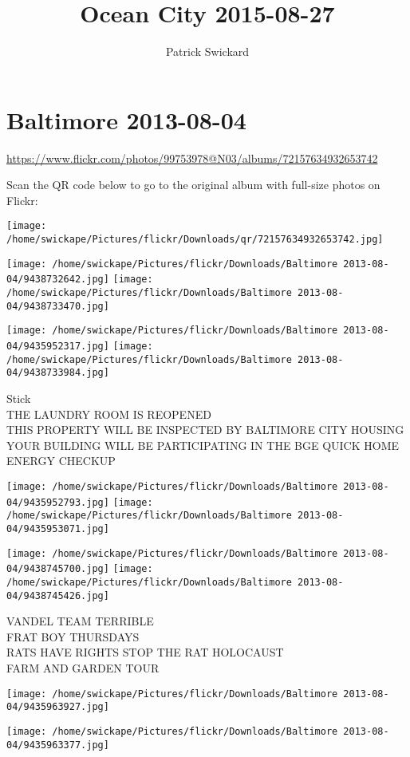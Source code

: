 \documentclass[10pt,letterpaper]{article}
\title{Ocean City 2015-08-27}
\author{Patrick Swickard}
\date{}
\begin{document}
\section*{Baltimore 2013-08-04}

\url{https://www.flickr.com/photos/99753978@N03/albums/72157634932653742}

Scan the QR code below to go to the original album with full-size photos on Flickr:

\texttt{[image: /home/swickape/Pictures/flickr/Downloads/qr/72157634932653742.jpg]}
\pagebreak

\texttt{[image: /home/swickape/Pictures/flickr/Downloads/Baltimore 2013-08-04/9438732642.jpg]}
\texttt{[image: /home/swickape/Pictures/flickr/Downloads/Baltimore 2013-08-04/9438733470.jpg]}

\texttt{[image: /home/swickape/Pictures/flickr/Downloads/Baltimore 2013-08-04/9435952317.jpg]}
\texttt{[image: /home/swickape/Pictures/flickr/Downloads/Baltimore 2013-08-04/9438733984.jpg]}

Stick\\
THE LAUNDRY ROOM IS REOPENED\\
THIS PROPERTY WILL BE INSPECTED BY BALTIMORE CITY HOUSING\\
YOUR BUILDING WILL BE PARTICIPATING IN THE BGE QUICK HOME ENERGY CHECKUP
\pagebreak

\texttt{[image: /home/swickape/Pictures/flickr/Downloads/Baltimore 2013-08-04/9435952793.jpg]}
\texttt{[image: /home/swickape/Pictures/flickr/Downloads/Baltimore 2013-08-04/9435953071.jpg]}

\texttt{[image: /home/swickape/Pictures/flickr/Downloads/Baltimore 2013-08-04/9438745700.jpg]}
\texttt{[image: /home/swickape/Pictures/flickr/Downloads/Baltimore 2013-08-04/9438745426.jpg]}

VANDEL TEAM TERRIBLE\\
FRAT BOY THURSDAYS\\
RATS HAVE RIGHTS STOP THE RAT HOLOCAUST\\
FARM AND GARDEN TOUR
\pagebreak

\texttt{[image: /home/swickape/Pictures/flickr/Downloads/Baltimore 2013-08-04/9435963927.jpg]}

\vspace{0.25in}
\texttt{[image: /home/swickape/Pictures/flickr/Downloads/Baltimore 2013-08-04/9435963377.jpg]}
\end{document}

